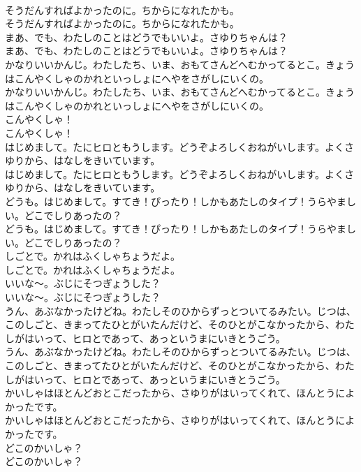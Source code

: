 \documentclass[8pt]{extreport}
\begin{document}
\begin{CJK}{UTF8}{min}
\\	そうだんすればよかったのに。ちからになれたかも。
\\	そうだんすればよかったのに。ちからになれたかも。
\\	まあ、でも、わたしのことはどうでもいいよ。さゆりちゃんは？
\\	まあ、でも、わたしのことはどうでもいいよ。さゆりちゃんは？
\\	かなりいいかんじ。わたしたち、いま、おもてさんどへむかってるとこ。きょうはこんやくしゃのかれといっしょにへやをさがしにいくの。
\\	かなりいいかんじ。わたしたち、いま、おもてさんどへむかってるとこ。きょうはこんやくしゃのかれといっしょにへやをさがしにいくの。
\\	こんやくしゃ！
\\	こんやくしゃ！
\\	はじめまして。たにヒロともうします。どうぞよろしくおねがいします。よくさゆりから、はなしをきいています。
\\	はじめまして。たにヒロともうします。どうぞよろしくおねがいします。よくさゆりから、はなしをきいています。
\\	どうも。はじめまして。すてき！ぴったり！しかもあたしのタイプ！うらやましい。どこでしりあったの？
\\	どうも。はじめまして。すてき！ぴったり！しかもあたしのタイプ！うらやましい。どこでしりあったの？
\\	しごとで。かれはふくしゃちょうだよ。
\\	しごとで。かれはふくしゃちょうだよ。
\\	いいな〜。ぶじにそつぎょうした？
\\	いいな〜。ぶじにそつぎょうした？
\\	うん、あぶなかったけどね。わたしそのひからずっとついてるみたい。じつは、このしごと、きまってたひとがいたんだけど、そのひとがこなかったから、わたしがはいって、ヒロとであって、あっというまにいきとうごう。
\\	うん、あぶなかったけどね。わたしそのひからずっとついてるみたい。じつは、このしごと、きまってたひとがいたんだけど、そのひとがこなかったから、わたしがはいって、ヒロとであって、あっというまにいきとうごう。
\\	かいしゃはほとんどおとこだったから、さゆりがはいってくれて、ほんとうによかったです。
\\	かいしゃはほとんどおとこだったから、さゆりがはいってくれて、ほんとうによかったです。
\\	どこのかいしゃ？
\\	どこのかいしゃ？

\end{CJK}
\end{document}
